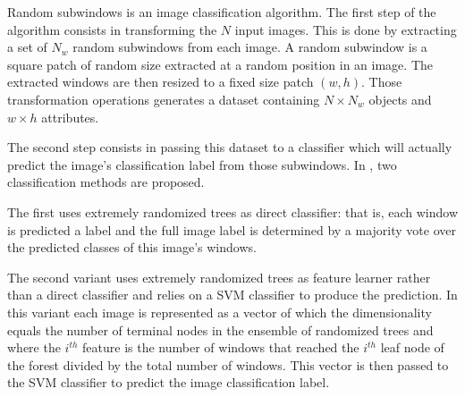 \label{app:random_subwindows}
Random subwindows \cite{Maree201617} is an image classification algorithm. The first step of the algorithm consists in transforming the $N$ input images. This is done by extracting a set of $N_w$ random subwindows from each image. A random subwindow is a square patch of random size extracted at a random position in an image. The extracted windows are then resized to a fixed size patch $(w, h)$. Those transformation operations generates a dataset containing $N\times N_w$ objects and $w \times h$ attributes. 

The second step consists in passing this dataset to a classifier which will actually predict the image's classification label from those subwindows. In \cite{Maree201617}, two classification methods are proposed.

The first uses extremely randomized trees \cite{Geurts2006} as direct classifier: that is, each window is predicted a label and the full image label is determined by a majority vote over the predicted classes of this image's windows.

The second variant uses extremely randomized trees as feature learner rather than a direct classifier and relies on a SVM classifier to produce the prediction. 
In this variant each image is represented as a vector of which the dimensionality equals the number of terminal nodes in the ensemble of randomized trees and where the $i^{th}$ feature is the number of windows that reached the $i^{th}$ leaf node of the forest divided by the total number of windows. This vector is then passed to the SVM classifier to predict the image classification label.



